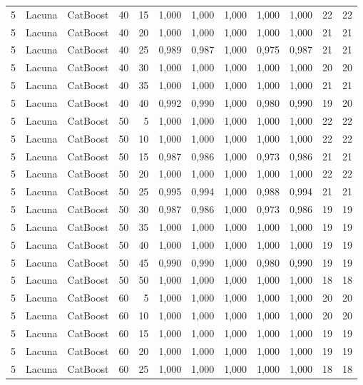 \begin{longtable}{@{}rllrrrrrrrrr@{}}
5 & Lacuna & CatBoost & 40 & 15 & 1,000 & 1,000 & 1,000 & 1,000 & 1,000 & 22 & 22 \\
5 & Lacuna & CatBoost & 40 & 20 & 1,000 & 1,000 & 1,000 & 1,000 & 1,000 & 21 & 21 \\
5 & Lacuna & CatBoost & 40 & 25 & 0,989 & 0,987 & 1,000 & 0,975 & 0,987 & 21 & 21 \\
5 & Lacuna & CatBoost & 40 & 30 & 1,000 & 1,000 & 1,000 & 1,000 & 1,000 & 20 & 20 \\
5 & Lacuna & CatBoost & 40 & 35 & 1,000 & 1,000 & 1,000 & 1,000 & 1,000 & 21 & 21 \\
5 & Lacuna & CatBoost & 40 & 40 & 0,992 & 0,990 & 1,000 & 0,980 & 0,990 & 19 & 20 \\
5 & Lacuna & CatBoost & 50 & 5 & 1,000 & 1,000 & 1,000 & 1,000 & 1,000 & 22 & 22 \\
5 & Lacuna & CatBoost & 50 & 10 & 1,000 & 1,000 & 1,000 & 1,000 & 1,000 & 22 & 22 \\
5 & Lacuna & CatBoost & 50 & 15 & 0,987 & 0,986 & 1,000 & 0,973 & 0,986 & 21 & 21 \\
5 & Lacuna & CatBoost & 50 & 20 & 1,000 & 1,000 & 1,000 & 1,000 & 1,000 & 22 & 22 \\
5 & Lacuna & CatBoost & 50 & 25 & 0,995 & 0,994 & 1,000 & 0,988 & 0,994 & 21 & 21 \\
5 & Lacuna & CatBoost & 50 & 30 & 0,987 & 0,986 & 1,000 & 0,973 & 0,986 & 19 & 19 \\
5 & Lacuna & CatBoost & 50 & 35 & 1,000 & 1,000 & 1,000 & 1,000 & 1,000 & 19 & 19 \\
5 & Lacuna & CatBoost & 50 & 40 & 1,000 & 1,000 & 1,000 & 1,000 & 1,000 & 19 & 19 \\
5 & Lacuna & CatBoost & 50 & 45 & 0,990 & 0,990 & 1,000 & 0,980 & 0,990 & 19 & 19 \\
5 & Lacuna & CatBoost & 50 & 50 & 1,000 & 1,000 & 1,000 & 1,000 & 1,000 & 18 & 18 \\
5 & Lacuna & CatBoost & 60 & 5 & 1,000 & 1,000 & 1,000 & 1,000 & 1,000 & 20 & 20 \\
5 & Lacuna & CatBoost & 60 & 10 & 1,000 & 1,000 & 1,000 & 1,000 & 1,000 & 20 & 20 \\
5 & Lacuna & CatBoost & 60 & 15 & 1,000 & 1,000 & 1,000 & 1,000 & 1,000 & 19 & 19 \\
5 & Lacuna & CatBoost & 60 & 20 & 1,000 & 1,000 & 1,000 & 1,000 & 1,000 & 19 & 19 \\
5 & Lacuna & CatBoost & 60 & 25 & 1,000 & 1,000 & 1,000 & 1,000 & 1,000 & 18 & 18 \\

\end{longtable}
